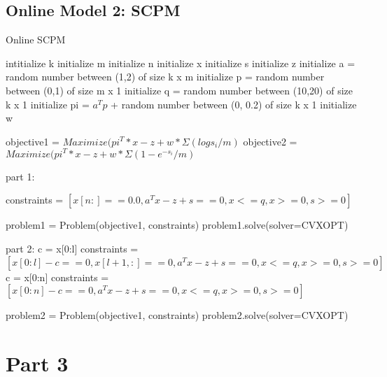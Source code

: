 \documentclass[12pt]{article}
\begin{document}
\subsection*{Online Model 2: SCPM}
\begin{algorithm}
\caption{Online SCPM}
\begin{algorithmic}
\STATE intitialize k
\STATE initialize m
\STATE initialize n
\STATE initialize x
\STATE initialize s
\STATE initialize z
\STATE initialize a = random number between (1,2) of size k x m 
\STATE initialize p = random number between (0,1) of size m x 1
\STATE initialize q = random number between (10,20) of size k x 1
\STATE initialize pi = $a^{T}p$ + random number between (0, 0.2) of size k x 1
\STATE initialize w

\STATE objective1 = $Maximize(pi^{T}*x -z + w*\Sigma(logs_i/m)$
\STATE objective2 = $Maximize(pi^{T}*x -z + w*\Sigma(1-e^{-s_i}/m)$

\STATE part 1:

\STATE constraints = $[x[n:] == 0.0,a^{T}x  - z + s == 0, x <= q, x >= 0, s >= 0]$

\STATE problem1 = Problem(objective1, constraints)
\STATE problem1.solve(solver=CVXOPT) 

\STATE part 2:
        \STATE  c = x[0:l]
        \STATE constraints = $[x[0:l] - c == 0,x[l+1,:]== 0, a^{T}x - z + s == 0, x <= q, x >= 0, s >= 0]$
      \ENDFOR
\STATE c = x[0:n]
\STATE constraints = $[x[0:n] - c == 0,a^{T}x  - z + s == 0, x <= q, x >= 0, s >= 0]$

\STATE problem2 = Problem(objective1, constraints)
\STATE problem2.solve(solver=CVXOPT) 
\end{algorithmic}
\end{algorithm}





\pagebreak

\section*{Part 3}
\end{document}
